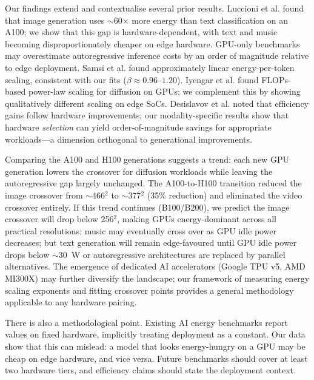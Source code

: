 \documentclass[11pt]{article}
\begin{document}
Our findings extend and contextualise several prior results. Luccioni et al.\cite{luccioni2024power} found that image generation uses $\sim$60$\times$ more energy than text classification on an A100; we show that this gap is hardware-dependent, with text and music becoming disproportionately cheaper on edge hardware. GPU-only benchmarks\cite{you2023zeus} may overestimate autoregressive inference costs by an order of magnitude relative to edge deployment. Samsi et al.\cite{samsi2023words} found approximately linear energy-per-token scaling, consistent with our fits ($\beta \approx 0.96$--$1.20$). Iyengar et al.\cite{castano2025energy} found FLOPs-based power-law scaling for diffusion on GPUs; we complement this by showing qualitatively different scaling on edge SoCs. Desislavov et al.\cite{desislavov2023trends} noted that efficiency gains follow hardware improvements; our modality-specific results show that hardware \textit{selection} can yield order-of-magnitude savings for appropriate workloads---a dimension orthogonal to generational improvements.

Comparing the A100 and H100 generations suggests a trend: each new GPU generation lowers the crossover for diffusion workloads while leaving the autoregressive gap largely unchanged. The A100-to-H100 transition reduced the image crossover from $\sim$466$^2$ to $\sim$377$^2$ (35\% reduction) and eliminated the video crossover entirely. If this trend continues (B100/B200), we predict the image crossover will drop below 256$^2$, making GPUs energy-dominant across all practical resolutions; music may eventually cross over as GPU idle power decreases; but text generation will remain edge-favoured until GPU idle power drops below $\sim$30~W or autoregressive architectures are replaced by parallel alternatives. The emergence of dedicated AI accelerators (Google TPU v5, AMD MI300X) may further diversify the landscape; our framework of measuring energy scaling exponents and fitting crossover points provides a general methodology applicable to any hardware pairing.

There is also a methodological point. Existing AI energy benchmarks\cite{you2023zeus,jegham2025hungry,luccioni2024power} report values on fixed hardware, implicitly treating deployment as a constant. Our data show that this can mislead: a model that looks energy-hungry on a GPU may be cheap on edge hardware, and vice versa. Future benchmarks should cover at least two hardware tiers, and efficiency claims should state the deployment context.
\end{document}
